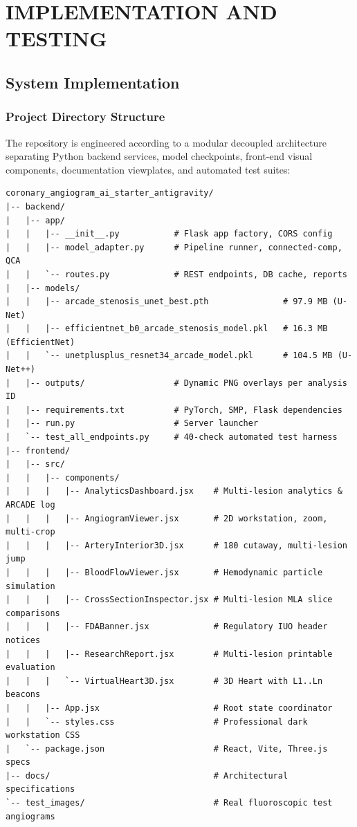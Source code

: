\chapter{IMPLEMENTATION AND TESTING}

\section{System Implementation}

\subsection{Project Directory Structure}
The repository is engineered according to a modular decoupled architecture separating Python backend services, model checkpoints, front-end visual components, documentation viewplates, and automated test suites:

\begin{lstlisting}[basicstyle=\scriptsize\ttfamily, frame=single, caption={Directory Layout of Coronary AI Platform}]
coronary_angiogram_ai_starter_antigravity/
|-- backend/
|   |-- app/
|   |   |-- __init__.py           # Flask app factory, CORS config
|   |   |-- model_adapter.py      # Pipeline runner, connected-comp, QCA
|   |   `-- routes.py             # REST endpoints, DB cache, reports
|   |-- models/
|   |   |-- arcade_stenosis_unet_best.pth               # 97.9 MB (U-Net)
|   |   |-- efficientnet_b0_arcade_stenosis_model.pkl   # 16.3 MB (EfficientNet)
|   |   `-- unetplusplus_resnet34_arcade_model.pkl      # 104.5 MB (U-Net++)
|   |-- outputs/                  # Dynamic PNG overlays per analysis ID
|   |-- requirements.txt          # PyTorch, SMP, Flask dependencies
|   |-- run.py                    # Server launcher
|   `-- test_all_endpoints.py     # 40-check automated test harness
|-- frontend/
|   |-- src/
|   |   |-- components/
|   |   |   |-- AnalyticsDashboard.jsx    # Multi-lesion analytics & ARCADE log
|   |   |   |-- AngiogramViewer.jsx       # 2D workstation, zoom, multi-crop
|   |   |   |-- ArteryInterior3D.jsx      # 180 cutaway, multi-lesion jump
|   |   |   |-- BloodFlowViewer.jsx       # Hemodynamic particle simulation
|   |   |   |-- CrossSectionInspector.jsx # Multi-lesion MLA slice comparisons
|   |   |   |-- FDABanner.jsx             # Regulatory IUO header notices
|   |   |   |-- ResearchReport.jsx        # Multi-lesion printable evaluation
|   |   |   `-- VirtualHeart3D.jsx        # 3D Heart with L1..Ln beacons
|   |   |-- App.jsx                       # Root state coordinator
|   |   `-- styles.css                    # Professional dark workstation CSS
|   `-- package.json                      # React, Vite, Three.js specs
|-- docs/                                 # Architectural specifications
`-- test_images/                          # Real fluoroscopic test angiograms
\end{lstlisting}


